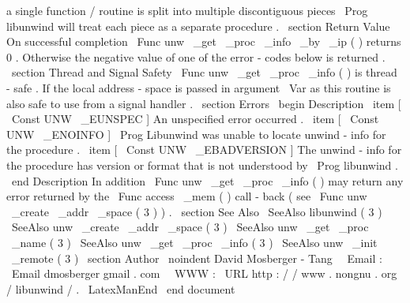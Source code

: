 a
single
function
/
routine
is
split
into
multiple
discontiguous
pieces
\
Prog
{
libunwind
}
will
treat
each
piece
as
a
separate
procedure
.
\
section
{
Return
Value
}
On
successful
completion
\
Func
{
unw
\
_get
\
_proc
\
_info
\
_by
\
_ip
}
(
)
returns
0
.
Otherwise
the
negative
value
of
one
of
the
error
-
codes
below
is
returned
.
\
section
{
Thread
and
Signal
Safety
}
\
Func
{
unw
\
_get
\
_proc
\
_info
}
(
)
is
thread
-
safe
.
If
the
local
address
-
space
is
passed
in
argument
\
Var
{
as
}
this
routine
is
also
safe
to
use
from
a
signal
handler
.
\
section
{
Errors
}
\
begin
{
Description
}
\
item
[
\
Const
{
UNW
\
_EUNSPEC
}
]
An
unspecified
error
occurred
.
\
item
[
\
Const
{
UNW
\
_ENOINFO
}
]
\
Prog
{
Libunwind
}
was
unable
to
locate
unwind
-
info
for
the
procedure
.
\
item
[
\
Const
{
UNW
\
_EBADVERSION
}
]
The
unwind
-
info
for
the
procedure
has
version
or
format
that
is
not
understood
by
\
Prog
{
libunwind
}
.
\
end
{
Description
}
In
addition
\
Func
{
unw
\
_get
\
_proc
\
_info
}
(
)
may
return
any
error
returned
by
the
\
Func
{
access
\
_mem
}
(
)
call
-
back
(
see
\
Func
{
unw
\
_create
\
_addr
\
_space
}
(
3
)
)
.
\
section
{
See
Also
}
\
SeeAlso
{
libunwind
(
3
)
}
\
SeeAlso
{
unw
\
_create
\
_addr
\
_space
(
3
)
}
\
SeeAlso
{
unw
\
_get
\
_proc
\
_name
(
3
)
}
\
SeeAlso
{
unw
\
_get
\
_proc
\
_info
(
3
)
}
\
SeeAlso
{
unw
\
_init
\
_remote
(
3
)
}
\
section
{
Author
}
\
noindent
David
Mosberger
-
Tang
\
\
Email
:
\
Email
{
dmosberger
gmail
.
com
}
\
\
WWW
:
\
URL
{
http
:
/
/
www
.
nongnu
.
org
/
libunwind
/
}
.
\
LatexManEnd
\
end
{
document
}

